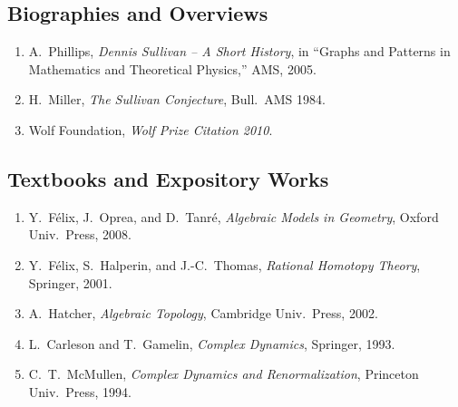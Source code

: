 \subsection*{Biographies and Overviews}
\begin{enumerate}
    \item A.\ Phillips, \textit{Dennis Sullivan -- A Short History}, in ``Graphs and Patterns in Mathematics and Theoretical Physics,'' AMS, 2005.
    \item H.\ Miller, \textit{The Sullivan Conjecture}, Bull.\ AMS 1984.
    \item Wolf Foundation, \textit{Wolf Prize Citation 2010}.
\end{enumerate}

\subsection*{Textbooks and Expository Works}
\begin{enumerate}
    \item Y.\ F\'elix, J.\ Oprea, and D.\ Tanr\'e, \textit{Algebraic Models in Geometry}, Oxford Univ.\ Press, 2008.
    \item Y.\ F\'elix, S.\ Halperin, and J.-C.\ Thomas, \textit{Rational Homotopy Theory}, Springer, 2001.
    \item A.\ Hatcher, \textit{Algebraic Topology}, Cambridge Univ.\ Press, 2002.
    \item L.\ Carleson and T.\ Gamelin, \textit{Complex Dynamics}, Springer, 1993.
    \item C.\ T.\ McMullen, \textit{Complex Dynamics and Renormalization}, Princeton Univ.\ Press, 1994.
\end{enumerate}

